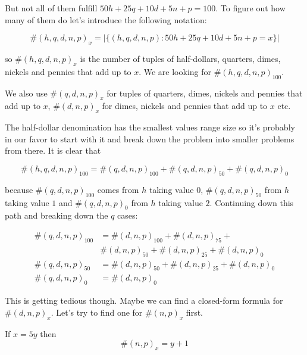 But not all of them fulfill $50 h + 25 q + 10 d + 5 n + p = 100$. To figure out how many of them do let's introduce the following notation:

\begin{equation*}
\#(h, q, d, n, p)_x = | \{(h, q, d, n, p) : 50 h + 25 q + 10 d + 5 n + p = x\} |
\end{equation*} 

so $\#(h, q, d, n, p)_x$ is the number of tuples of half-dollars, quarters, dimes, nickels and pennies that add up to $x$. We are looking for $\#(h, q, d, n, p)_{100}$. 

We also use $\#(q, d, n, p)_x$ for tuples of quarters, dimes, nickels and pennies that add up to $x$, $\#(d, n, p)_x$ for dimes, nickels and pennies that add up to $x$ etc.

The half-dollar denomination has the smallest values range size so it's probably in our favor to start with it and break down the problem into smaller problems from there. It is clear that

\begin{equation*}
\#(h, q, d, n, p)_{100} = \#(q, d, n, p)_{100} + \#(q, d, n, p)_{50} + \#(q, d, n, p)_0
\end{equation*} 

because $\#(q, d, n, p)_{100}$ comes from $h$ taking value $0$, $\#(q, d, n, p)_{50}$ from $h$ taking value $1$ and $ \#(q, d, n, p)_0$ from $h$ taking value $2$. Continuing down this path and breaking down the $q$ cases:

\begin{equation*}
    \begin{split}
      \#(q, d, n, p)_{100} & = \#(d, n, p)_{100} + \#(d, n, p)_{75} +\\
      &  \#(d, n, p)_{50} + \#(d, n, p)_{25} + \#(d, n, p)_0\\
      \#(q, d, n, p)_{50} & = \#(d, n, p)_{50} + \#(d, n, p)_{25} + \#(d, n, p)_0\\
      \#(q, d, n, p)_{0} & = \#(d, n, p)_0
    \end{split}
\end{equation*} 

This is getting tedious though. Maybe we can find a closed-form formula for $\#(d, n, p)_{x}$. Let's try to find one for $\#(n, p)_{x}$ first.

\begin{lem}\label{np}
If $x = 5y$ then
\begin{equation*}
\#(n, p)_{x} = y + 1
\end{equation*}  
\end{lem}

